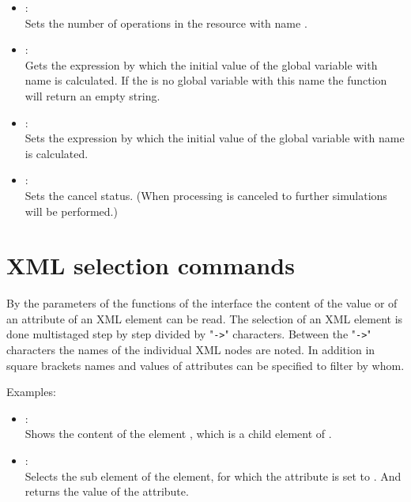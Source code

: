 \begin{itemize}
\item
{}:\\
Sets the number of operations in the resource with name .

\item
{}:\\
Gets the expression by which the initial value of the global variable with
name  is calculated. If the is no global variable with
this name the function will return an empty string.

\item
{}:\\
Sets the expression by which the initial value of the global variable with
name  is calculated.

\item
{}:\\
Sets the cancel status. (When processing is canceled to further simulations will be performed.)

\end{itemize}



\chapter{XML selection commands}

By the parameters of the functions of the  interface the content of the
value or of an attribute of an XML element can be read.
The selection of an XML element is done multistaged step by step divided by
"\texttt{->}" characters. Between the "\texttt{->}" characters the names of the individual XML nodes are
noted. In addition in square brackets names and values of attributes can be specified to filter by whom.

Examples:

\begin{itemize}

\item
{}:\\
Shows the content of the element , which is a child element of .

\item
{}:\\
Selects the  sub element of the  element, for
which the  attribute is set to . And returns the value of the
 attribute.

\end{itemize}